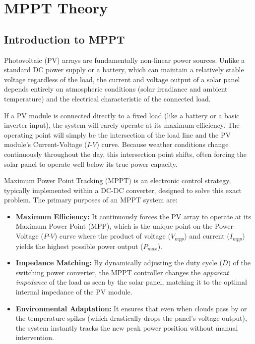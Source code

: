 \section{MPPT Theory}

\subsection{Introduction to MPPT}
Photovoltaic (PV) arrays are fundamentally non-linear power sources. Unlike a standard DC power supply or a battery, which can maintain a relatively stable voltage regardless of the load, the current and voltage output of a solar panel depends entirely on atmospheric conditions (solar irradiance and ambient temperature) and the electrical characteristic of the connected load.

If a PV module is connected directly to a fixed load (like a battery or a basic inverter input), the system will rarely operate at its maximum efficiency. The operating point will simply be the intersection of the load line and the PV module's Current-Voltage ($I$-$V$) curve. Because weather conditions change continuously throughout the day, this intersection point shifts, often forcing the solar panel to operate well below its true power capacity.

Maximum Power Point Tracking (MPPT) is an electronic control strategy, typically implemented within a DC-DC converter, designed to solve this exact problem. The primary purposes of an MPPT system are:

\begin{itemize}
    \item \textbf{Maximum Efficiency:} It continuously forces the PV array to operate at its Maximum Power Point (MPP), which is the unique point on the Power-Voltage ($P$-$V$) curve where the product of voltage ($V_{mpp}$) and current ($I_{mpp}$) yields the highest possible power output ($P_{max}$).
    \item \textbf{Impedance Matching:} By dynamically adjusting the duty cycle ($D$) of the switching power converter, the MPPT controller changes the \textit{apparent impedance} of the load as seen by the solar panel, matching it to the optimal internal impedance of the PV module.
    \item \textbf{Environmental Adaptation:} It ensures that even when clouds pass by or the temperature spikes (which drastically drops the panel's voltage output), the system instantly tracks the new peak power position without manual intervention.
\end{itemize}

